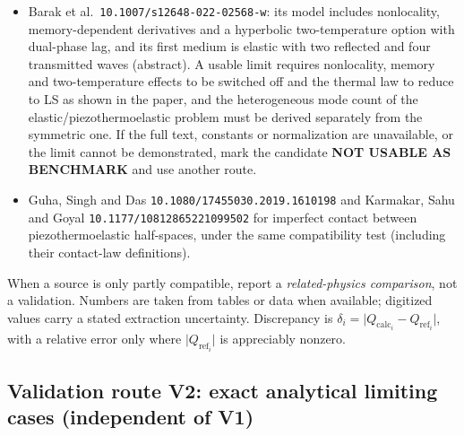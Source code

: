 \documentclass[11pt]{article}
\begin{document}
\begin{itemize}
  \item Barak et al.\ \texttt{10.1007/s12648-022-02568-w}: its model includes
    nonlocality, memory-dependent derivatives and a hyperbolic two-temperature
    option with dual-phase lag, and its first medium is elastic with two reflected
    and four transmitted waves (abstract). A usable limit requires nonlocality,
    memory and two-temperature effects to be switched off and the thermal law to
    reduce to LS as shown in the paper, and the heterogeneous mode count of the
    elastic/piezothermoelastic problem must be derived separately from the
    symmetric one. If the full text, constants or normalization are unavailable,
    or the limit cannot be demonstrated, mark the candidate \textbf{NOT USABLE AS
    BENCHMARK} and use another route.
  \item Guha, Singh and Das \texttt{10.1080/17455030.2019.1610198} and Karmakar,
    Sahu and Goyal \texttt{10.1177/10812865221099502} for imperfect contact
    between piezothermoelastic half-spaces, under the same compatibility test
    (including their contact-law definitions).
\end{itemize}

When a source is only partly compatible, report a \emph{related-physics
comparison}, not a validation. Numbers are taken from tables or data when
available; digitized values carry a stated extraction uncertainty. Discrepancy is
$\delta_i = \lvert Q_{\text{calc}_i} - Q_{\text{ref}_i}\rvert$, with a relative
error only where $\lvert Q_{\text{ref}_i}\rvert$ is appreciably nonzero.

\subsection{Validation route V2: exact analytical limiting cases (independent of
V1)}
\end{document}
